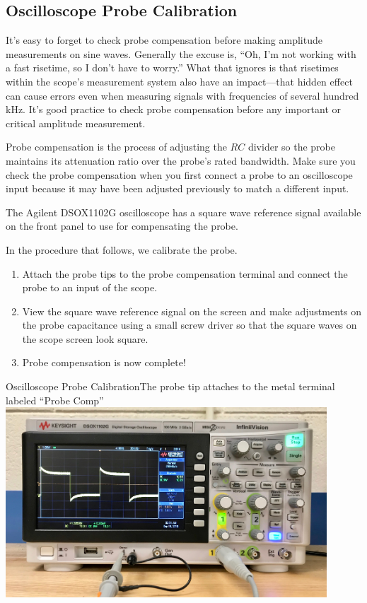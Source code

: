 \documentclass[12pt]{../manual}
\begin{document}
\subsection{Oscilloscope Probe Calibration}
It's easy to forget to check probe compensation before making amplitude measurements on sine waves. Generally the excuse is, ``Oh, I'm not working with a fast risetime, so I don't have to worry.''  What that ignores is that risetimes within the scope's measurement system also have an impact---that hidden effect can cause errors even when measuring signals with frequencies of several hundred kHz. It's good practice to check probe compensation before any important or critical amplitude measurement. 

Probe compensation is the process of adjusting the $RC$ divider so the probe maintains its attenuation ratio over the probe's rated bandwidth. Make sure you check the probe compensation when you first connect a probe to an oscilloscope input because it may have been adjusted previously to match a different input.   

The Agilent DSOX1102G oscilloscope has a square wave reference signal available on the front panel to use for compensating the probe.

In the procedure that follows, we calibrate the probe.
\begin{enumerate}
\item Attach the probe tips to the probe compensation terminal and connect the probe to an input of the scope. 
\item View the square wave reference signal on the screen and make adjustments on the probe capacitance using a small screw driver so that the square waves on the scope screen look square.
\item Probe compensation is now complete!
\end{enumerate}

\begin{myfigure}[label=fig:oscprobecomp]{Oscilloscope Probe Calibration}{The probe tip attaches to the metal terminal labeled ``Probe Comp''}
\centering
\includegraphics[width=0.9\textwidth]{figures/OscProbeComp.jpeg}
\end{myfigure}
\end{document}
